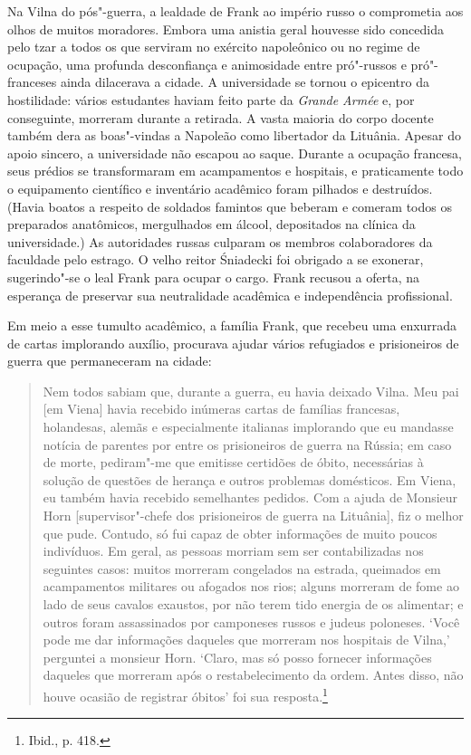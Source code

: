 Na Vilna do pós"-guerra, a lealdade de Frank ao império russo o
comprometia aos olhos de muitos moradores. Embora uma anistia geral
houvesse sido concedida pelo tzar a todos os que serviram no exército
napoleônico ou no regime de ocupação, uma profunda desconfiança e
animosidade entre pró"-russos e pró"-franceses ainda dilacerava a cidade.
A universidade se tornou o epicentro da hostilidade: vários estudantes
haviam feito parte da \textit{Grande Armée} e, por conseguinte, morreram
durante a retirada. A vasta maioria do corpo docente também dera as
boas"-vindas a Napoleão como libertador da Lituânia. Apesar do apoio
sincero, a universidade não escapou ao saque. Durante a ocupação
francesa, seus prédios se transformaram em acampamentos e hospitais, e
praticamente todo o equipamento científico e inventário acadêmico foram
pilhados e destruídos. (Havia boatos a respeito de soldados famintos que
beberam e comeram todos os preparados anatômicos, mergulhados em álcool,
depositados na clínica da universidade.) As autoridades russas culparam
os membros colaboradores da faculdade pelo estrago. O velho reitor
Śniadecki foi obrigado a se exonerar, sugerindo"-se o leal Frank para
ocupar o cargo. Frank recusou a oferta, na esperança de preservar sua
neutralidade acadêmica e independência profissional.

Em meio a esse tumulto acadêmico, a família Frank, que recebeu uma
enxurrada de cartas implorando auxílio, procurava ajudar vários
refugiados e prisioneiros de guerra que permaneceram na cidade:

\begin{quote}
Nem todos sabiam que, durante a guerra, eu havia deixado Vilna. Meu pai
{[}em Viena{]} havia recebido inúmeras cartas de famílias francesas,
holandesas, alemãs e especialmente italianas implorando que eu mandasse
notícia de parentes por entre os prisioneiros de guerra na Rússia; em
caso de morte, pediram"-me que emitisse certidões de óbito, necessárias à
solução de questões de herança e outros problemas domésticos. Em Viena,
eu também havia recebido semelhantes pedidos. Com a ajuda de Monsieur
Horn {[}supervisor"-chefe dos prisioneiros de guerra na Lituânia{]}, fiz
o melhor que pude. Contudo, só fui capaz de obter informações de muito
poucos indivíduos. Em geral, as pessoas morriam sem ser contabilizadas
nos seguintes casos: muitos morreram congelados na estrada, queimados em
acampamentos militares ou afogados nos rios; alguns morreram de fome ao
lado de seus cavalos exaustos, por não terem tido energia de os
alimentar; e outros foram assassinados por camponeses russos e judeus
poloneses. `Você pode me dar informações daqueles que morreram nos
hospitais de Vilna,' perguntei a monsieur Horn. `Claro, mas só posso
fornecer informações daqueles que morreram após o restabelecimento da
ordem. Antes disso, não houve ocasião de registrar óbitos' foi sua
resposta.\footnote{Ibid., p. 418.}
\end{quote}

